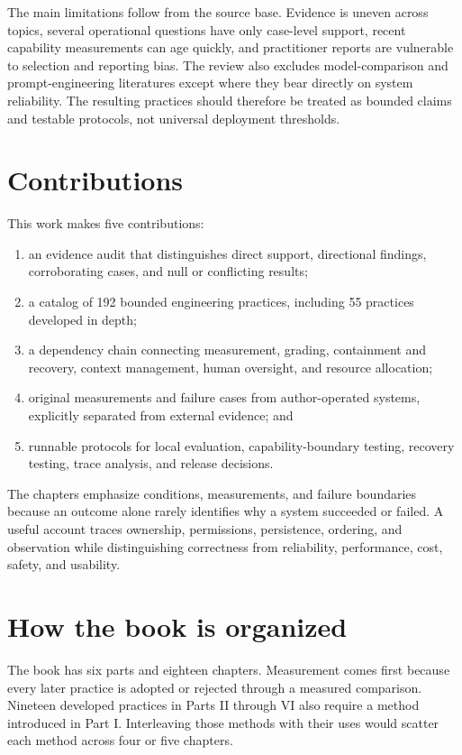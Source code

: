 The main limitations follow from the source base. Evidence is uneven across topics, several operational questions have only case-level support, recent capability measurements can age quickly, and practitioner reports are vulnerable to selection and reporting bias. The review also excludes model-comparison and prompt-engineering literatures except where they bear directly on system reliability. The resulting practices should therefore be treated as bounded claims and testable protocols, not universal deployment thresholds.

\section{Contributions}\label{contributions}

This work makes five contributions:

\begin{enumerate}
\def\labelenumi{\arabic{enumi}.}
\tightlist
\item
  an evidence audit that distinguishes direct support, directional findings, corroborating cases, and null or conflicting results;
\item
  a catalog of 192 bounded engineering practices, including 55 practices developed in depth;
\item
  a dependency chain connecting measurement, grading, containment and recovery, context management, human oversight, and resource allocation;
\item
  original measurements and failure cases from author-operated systems, explicitly separated from external evidence; and
\item
  runnable protocols for local evaluation, capability-boundary testing, recovery testing, trace analysis, and release decisions.
\end{enumerate}

The chapters emphasize conditions, measurements, and failure boundaries because an outcome alone rarely identifies why a system succeeded or failed. A useful account traces ownership, permissions, persistence, ordering, and observation while distinguishing correctness from reliability, performance, cost, safety, and usability.

\section{How the book is organized}\label{how-the-book-is-organized}

The book has six parts and eighteen chapters. Measurement comes first because every later practice is adopted or rejected through a measured comparison. Nineteen developed practices in Parts II through VI also require a method introduced in Part I. Interleaving those methods with their uses would scatter each method across four or five chapters.

